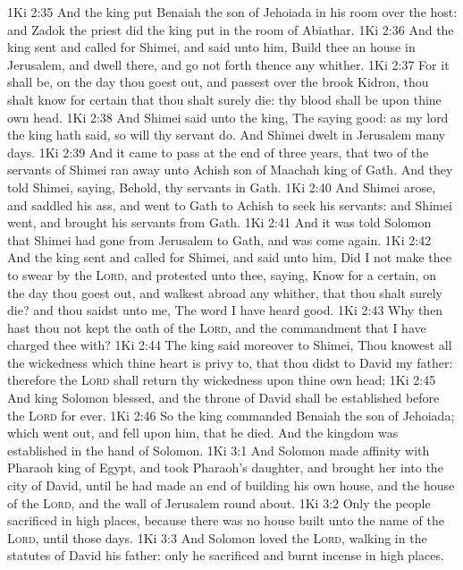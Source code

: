 \vs 1Ki 2:35 And the king put Benaiah the son of Jehoiada in his room over the host: and Zadok the priest did the king put in the room of Abiathar.
\vs 1Ki 2:36 And the king sent and called for Shimei, and said unto him, Build thee an house in Jerusalem, and dwell there, and go not forth thence any whither.
\vs 1Ki 2:37 For it shall be,  on the day thou goest out, and passest over the brook Kidron, thou shalt know for certain that thou shalt surely die: thy blood shall be upon thine own head.
\vs 1Ki 2:38 And Shimei said unto the king, The saying  good: as my lord the king hath said, so will thy servant do. And Shimei dwelt in Jerusalem many days.
\vs 1Ki 2:39 And it came to pass at the end of three years, that two of the servants of Shimei ran away unto Achish son of Maachah king of Gath. And they told Shimei, saying, Behold, thy servants  in Gath.
\vs 1Ki 2:40 And Shimei arose, and saddled his ass, and went to Gath to Achish to seek his servants: and Shimei went, and brought his servants from Gath.
\vs 1Ki 2:41 And it was told Solomon that Shimei had gone from Jerusalem to Gath, and was come again.
\vs 1Ki 2:42 And the king sent and called for Shimei, and said unto him, Did I not make thee to swear by the \textsc{Lord}, and protested unto thee, saying, Know for a certain, on the day thou goest out, and walkest abroad any whither, that thou shalt surely die? and thou saidst unto me, The word  I have heard  good.
\vs 1Ki 2:43 Why then hast thou not kept the oath of the \textsc{Lord}, and the commandment that I have charged thee with?
\vs 1Ki 2:44 The king said moreover to Shimei, Thou knowest all the wickedness which thine heart is privy to, that thou didst to David my father: therefore the \textsc{Lord} shall return thy wickedness upon thine own head;
\vs 1Ki 2:45 And king Solomon  blessed, and the throne of David shall be established before the \textsc{Lord} for ever.
\vs 1Ki 2:46 So the king commanded Benaiah the son of Jehoiada; which went out, and fell upon him, that he died. And the kingdom was established in the hand of Solomon.
\vs 1Ki 3:1 And Solomon made affinity with Pharaoh king of Egypt, and took Pharaoh's daughter, and brought her into the city of David, until he had made an end of building his own house, and the house of the \textsc{Lord}, and the wall of Jerusalem round about.
\vs 1Ki 3:2 Only the people sacrificed in high places, because there was no house built unto the name of the \textsc{Lord}, until those days.
\vs 1Ki 3:3 And Solomon loved the \textsc{Lord}, walking in the statutes of David his father: only he sacrificed and burnt incense in high places.
